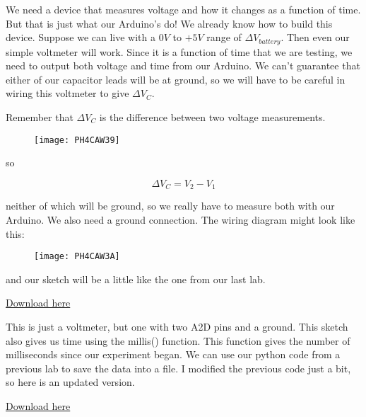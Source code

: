 We need a device that measures voltage and how it changes as a function of time. But that is just what our Arduino's do! We already know how to build this device. Suppose we can live with a $0\unit{V}$ to $+5\unit{V}$ range of $\Delta V_{battery}.$ Then even our simple voltmeter will work. Since it is a function of time that we are testing, we need to output both voltage and time from our Arduino. We can't guarantee that either of our capacitor leads will be at ground, so we will have to be careful in wiring this voltmeter to give $\Delta V_{C}.$

Remember that $\Delta V_{C}$ is the difference between two voltage
measurements. 

\begin{figure}[h!]
	\centering
	\texttt{[image: PH4CAW39]}
\end{figure}

\noindent so 

\begin{equation*}
	\Delta V_{C}=V_{2}-V_{1}
\end{equation*}

neither of which will be ground, so we really have to measure both with our Arduino. We also need a ground connection. The wiring diagram might look like this:

\begin{figure}[h!]
	\centering
	\texttt{[image: PH4CAW3A]}
\end{figure}

\noindent and our sketch will be a little like the one from our last lab.

\vspace{0.24in}
\href{https://raw.githubusercontent.com/rtlines/IntermediateLabPH250/main/Code/RC_Volts_vsTime.ino}{Download here}


This is just a voltmeter, but one with two A2D pins and a ground. This sketch also gives us time using the millis() function. This function gives the number of milliseconds since our experiment began. We can use our python code from a previous lab to save the data into a file. I modified the previous code just a bit, so here is an updated version.

\href{https://raw.githubusercontent.com/rtlines/IntermediateLabPH250/main/Code/RC_ReadSaveFile.py}{Download here}


